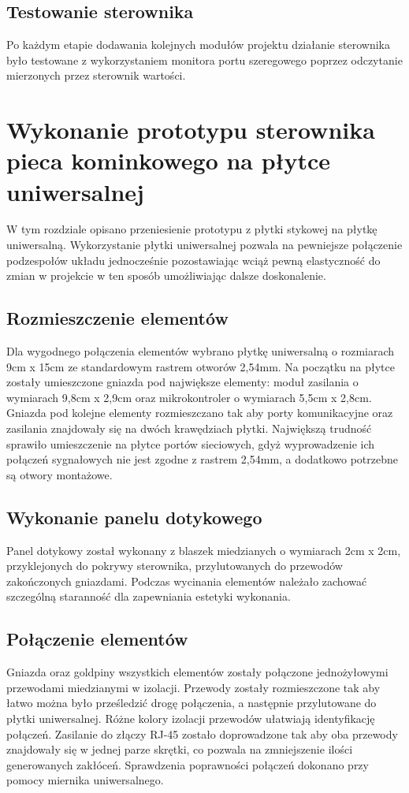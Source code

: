 \documentclass[11pt]{report}
\begin{document}
 \section{Testowanie sterownika}
 Po każdym etapie dodawania kolejnych modułów projektu działanie sterownika było testowane z wykorzystaniem monitora portu szeregowego poprzez odczytanie mierzonych przez sterownik wartości.

 
 \chapter{Wykonanie prototypu sterownika pieca kominkowego na płytce uniwersalnej}\label{ch:prototyp:uniwersalna}
 W tym rozdziale opisano przeniesienie prototypu z płytki stykowej na płytkę uniwersalną.
 Wykorzystanie płytki uniwersalnej pozwala na pewniejsze połączenie podzespołów układu jednocześnie pozostawiając wciąż pewną elastyczność do zmian w projekcie w ten sposób umożliwiając dalsze doskonalenie.
 
 \section{Rozmieszczenie elementów}
 Dla wygodnego połączenia elementów wybrano płytkę uniwersalną o rozmiarach 9cm x 15cm ze standardowym rastrem otworów 2,54mm.
 Na początku na płytce zostały umieszczone gniazda pod największe elementy: moduł zasilania o wymiarach 9,8cm x 2,9cm oraz mikrokontroler o wymiarach 5,5cm x 2,8cm. Gniazda pod kolejne elementy rozmieszczano tak aby porty komunikacyjne oraz zasilania znajdowały się na dwóch krawędziach płytki. 
 Największą trudność sprawiło umieszczenie na płytce portów sieciowych, gdyż wyprowadzenie ich połączeń sygnałowych nie jest zgodne z rastrem 2,54mm, a dodatkowo potrzebne są otwory montażowe.
  
  \section{Wykonanie panelu dotykowego}
 Panel dotykowy został wykonany z blaszek miedzianych o wymiarach 2cm x 2cm, przyklejonych do pokrywy sterownika, przylutowanych do przewodów zakończonych gniazdami. Podczas wycinania elementów należało zachować szczególną staranność dla zapewniania estetyki wykonania.

 \section{Połączenie elementów}
 Gniazda oraz goldpiny wszystkich elementów zostały połączone jednożyłowymi przewodami miedzianymi w izolacji. Przewody zostały rozmieszczone tak aby łatwo można było prześledzić drogę połączenia, a następnie przylutowane do płytki uniwersalnej. Różne kolory izolacji przewodów ułatwiają identyfikację połączeń. Zasilanie do złączy RJ-45 zostało doprowadzone tak aby oba przewody znajdowały się w jednej parze skrętki, co pozwala na zmniejszenie ilości generowanych zakłóceń.
 Sprawdzenia poprawności połączeń dokonano przy pomocy miernika uniwersalnego.
\end{document}
